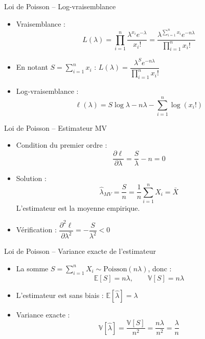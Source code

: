 \documentclass[11pt,aspectratio=169]{beamer}
\begin{document}
\begin{frame}{Loi de Poisson -- Log-vraisemblance}

\begin{itemize}

\item Vraisemblance :
  \[
  L(\lambda) = \prod_{i=1}^n \frac{\lambda^{x_i} e^{-\lambda}}{x_i!} = \frac{\lambda^{\sum_{i=1}^n x_i} e^{-n\lambda}}{\prod_{i=1}^n x_i!}
  \]

\item En notant $S = \sum_{i=1}^n x_i$ : $L(\lambda) = \dfrac{\lambda^S e^{-n\lambda}}{\prod_{i=1}^n x_i!}$\newline

\item Log-vraisemblance :
  \[
  \ell(\lambda) = S \log \lambda - n\lambda - \sum_{i=1}^n \log(x_i!)
  \]

\end{itemize}

\end{frame}

\begin{frame}{Loi de Poisson -- Estimateur MV}

\begin{itemize}

\item Condition du premier ordre :
  \[
  \frac{\partial \ell}{\partial \lambda} = \frac{S}{\lambda} - n = 0
  \]

\item Solution :
  \[
  \boxed{\hat{\lambda}_{MV} = \frac{S}{n} = \frac{1}{n}\sum_{i=1}^n X_i = \bar{X}}
  \]
  L'estimateur est la moyenne empirique.\newline

\item Vérification : $\dfrac{\partial^2 \ell}{\partial \lambda^2} = -\dfrac{S}{\lambda^2} < 0$ \checkmark

\end{itemize}

\end{frame}


\begin{frame}{Loi de Poisson -- Variance exacte de l'estimateur}

\begin{itemize}

\item La somme $S = \sum_{i=1}^n X_i \sim \text{Poisson}(n\lambda)$, donc :
  \[
  \mathbb{E}[S] = n\lambda, \qquad \mathbb{V}[S] = n\lambda
  \]

\item L'estimateur est sans biais : $\mathbb{E}[\hat{\lambda}] = \lambda$\newline

\item Variance exacte :
  \[
  \boxed{\mathbb{V}[\hat{\lambda}] = \frac{\mathbb{V}[S]}{n^2} = \frac{n\lambda}{n^2} = \frac{\lambda}{n}}
  \]

\end{itemize}

\end{frame}
\end{document}
